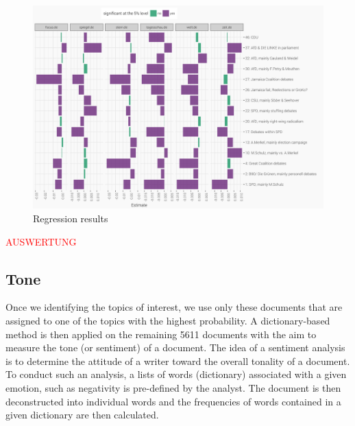 \documentclass[12pt,a4paper,notitlepage]{article}
\begin{document}
\begin{figure}[H]
	\caption{Regression results}
		\begin{center}
			\includegraphics[width=\textwidth,keepaspectratio]{../figs/estimates.png}
		\end{center}
	\label{fig_estimateEffects}
\end{figure}

\textcolor{red}{AUSWERTUNG}


\subsection{Tone}\label{subsection_tone}

Once we identifying the topics of interest, we use only these documents that are assigned to one of the topics with the highest probability. A dictionary-based method is then applied on the remaining 5611 documents with the aim to measure the tone (or sentiment) of a document. The idea of a sentiment analysis is to determine the attitude of a writer toward the overall tonality of a document. To conduct such an analysis, a lists of words (dictionary) associated with a given emotion, such as negativity is pre-defined by the analyst. The document is then deconstructed into individual words and the frequencies of words contained in a given dictionary are then calculated. 
\end{document}
